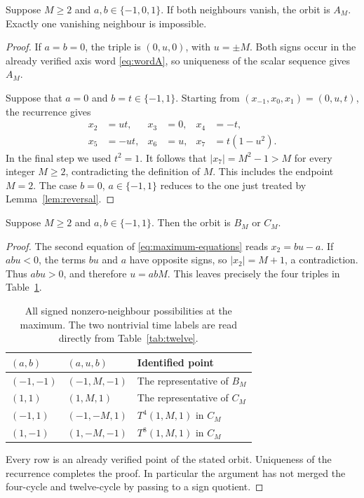 \begin{lemma}\label{lem:zeros}
Suppose $M\geq2$ and $a,b\in\{-1,0,1\}$. If both
neighbours vanish, the orbit is $A_M$. Exactly one vanishing
neighbour is impossible.
\end{lemma}
\begin{proof}
If $a=b=0$, the triple is $(0,u,0)$, with $u=\pm M$.
Both signs occur in the already verified axis word
\eqref{eq:wordA}, so uniqueness of the scalar sequence gives $A_M$.

Suppose that $a=0$ and $b=t\in\{-1,1\}$. Starting from
$(x_{-1},x_0,x_1)=(0,u,t)$, the recurrence gives
\begin{align}
 x_2&=ut,& x_3&=0,& x_4&=-t,\nonumber\\
 x_5&=-ut,& x_6&=u,& x_7&=t(1-u^2).
 \label{eq:zero-contradiction}
\end{align}
In the final step we used $t^2=1$. It follows that
$|x_7|=M^2-1>M$ for every integer $M\geq2$, contradicting
the definition of $M$. This includes the endpoint $M=2$.
The case $b=0$, $a\in\{-1,1\}$ reduces to the one just
treated by Lemma~\ref{lem:reversal}.
\end{proof}

\begin{lemma}\label{lem:signs}
Suppose $M\geq2$ and $a,b\in\{-1,1\}$. Then the orbit
is $B_M$ or $C_M$.
\end{lemma}
\begin{proof}
The second equation of \eqref{eq:maximum-equations} reads
$x_2=bu-a$. If $abu<0$, the terms $bu$ and $a$ have
opposite signs, so $|x_2|=M+1$, a contradiction. Thus $abu>0$,
and therefore $u=abM$. This leaves precisely the four triples
in Table~\ref{tab:signs}.

\begin{table}[htbp]
\centering
\begin{tabular}{@{}lll@{}}
\toprule
$(a,b)$ & $(a,u,b)$ & Identified point\\
\midrule
$(-1,-1)$ & $(-1,M,-1)$ & The representative of $B_M$\\
$(1,1)$ & $(1,M,1)$ & The representative of $C_M$\\
$(-1,1)$ & $(-1,-M,1)$ & $T^4(1,M,1)$ in $C_M$\\
$(1,-1)$ & $(1,-M,-1)$ & $T^8(1,M,1)$ in $C_M$\\
\bottomrule
\end{tabular}
\caption{All signed nonzero-neighbour possibilities at the maximum.
The two nontrivial time labels are read directly from
Table~\ref{tab:twelve}.}
\label{tab:signs}
\end{table}

Every row is an already verified point of the stated orbit. Uniqueness
of the recurrence completes the proof. In particular the argument has
not merged the four-cycle and twelve-cycle by passing to a sign quotient.
\end{proof}

